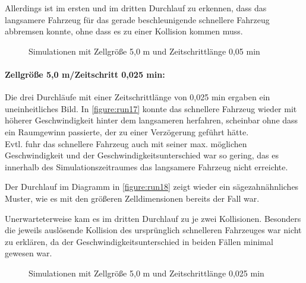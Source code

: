Allerdings ist im ersten und im dritten Durchlauf zu erkennen, dass das langsamere Fahrzeug für das gerade beschleunigende schnellere Fahrzeug abbremsen konnte, ohne dass es zu einer Kollision kommen muss. 
\begin{figure}[hptb]
  \centering 
   \qquad 
   \qquad 
  \caption{Simulationen mit Zellgröße 5,0 m und Zeitschrittlänge 0,05 min} 
  \label{figure:run14-16}
\end{figure}


\paragraph*{Zellgröße 5,0 m/Zeitschritt 0,025 min:}
Die drei Durchläufe mit einer Zeitschrittlänge von 0,025 min ergaben ein uneinheitliches Bild.
In \cref{figure:run17} konnte das schnellere Fahrzeug wieder mit höherer Geschwindigkeit hinter dem langsameren herfahren, scheinbar ohne dass ein Raumgewinn passierte, der zu einer Verzögerung geführt hätte.
\\
Evtl. fuhr das schnellere Fahrzeug auch mit seiner max. möglichen Geschwindigkeit und der Geschwindigkeitsunterschied war so gering, das es innerhalb des Simulationszeitraumes das langsamere Fahrzeug nicht erreichte.

Der Durchlauf im Diagramm in \cref{figure:run18} zeigt wieder ein sägezahnähnliches Muster, wie es mit den größeren Zelldimensionen bereits der Fall war.

Unerwarteterweise kam es im dritten Durchlauf zu je zwei Kollisionen.
Besonders die jeweils auslösende Kollision des ursprünglich schnelleren Fahrzeuges war nicht zu erklären, da der Geschwindigkeitsunterschied in beiden Fällen minimal gewesen war.
\begin{figure}[hptb]
  \centering 
   \qquad 
   \qquad 
  \caption{Simulationen mit Zellgröße 5,0 m und Zeitschrittlänge 0,025 min} 
  \label{figure:run17-19}
\end{figure}


